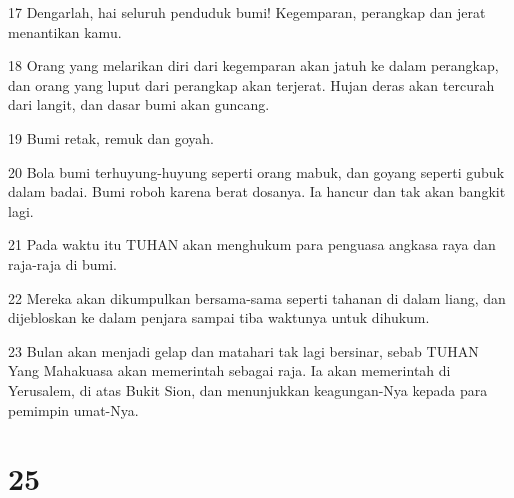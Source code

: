 \par 17 Dengarlah, hai seluruh penduduk bumi! Kegemparan, perangkap dan jerat menantikan kamu.
\par 18 Orang yang melarikan diri dari kegemparan akan jatuh ke dalam perangkap, dan orang yang luput dari perangkap akan terjerat. Hujan deras akan tercurah dari langit, dan dasar bumi akan guncang.
\par 19 Bumi retak, remuk dan goyah.
\par 20 Bola bumi terhuyung-huyung seperti orang mabuk, dan goyang seperti gubuk dalam badai. Bumi roboh karena berat dosanya. Ia hancur dan tak akan bangkit lagi.
\par 21 Pada waktu itu TUHAN akan menghukum para penguasa angkasa raya dan raja-raja di bumi.
\par 22 Mereka akan dikumpulkan bersama-sama seperti tahanan di dalam liang, dan dijebloskan ke dalam penjara sampai tiba waktunya untuk dihukum.
\par 23 Bulan akan menjadi gelap dan matahari tak lagi bersinar, sebab TUHAN Yang Mahakuasa akan memerintah sebagai raja. Ia akan memerintah di Yerusalem, di atas Bukit Sion, dan menunjukkan keagungan-Nya kepada para pemimpin umat-Nya.

\chapter{25}

